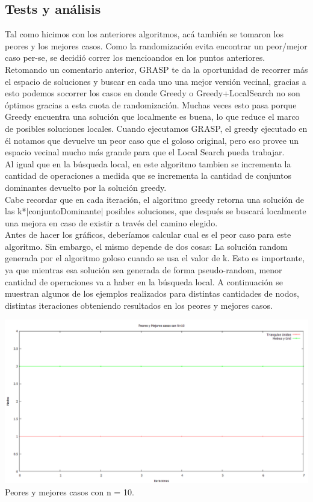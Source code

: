 \subsection{Tests y análisis}
Tal como hicimos con los anteriores algoritmos, acá también se tomaron los peores y los mejores casos. Como la randomización evita encontrar un peor/mejor caso per-se, se 
decidió correr los mencioandos
en los puntos anteriores. Retomando un comentario anterior, GRASP te da la oportunidad de recorrer más el espacio de soluciones y buscar en cada uno una mejor versión vecinal, 
gracias a esto podemos socorrer los 
casos en donde Greedy o Greedy+LocalSearch no son óptimos gracias a esta cuota de randomización. Muchas veces esto pasa porque Greedy encuentra una solución que localmente es 
buena, lo que reduce el marco 
de posibles soluciones locales. Cuando ejecutamos GRASP, el greedy ejecutado en él notamos que devuelve un peor caso que el goloso original, pero eso provee un espacio vecinal 
mucho más grande para que el Local
Search pueda trabajar. \\
Al igual que en la búsqueda local, en este algoritmo tambien se incrementa la cantidad de operaciones a medida
que se incrementa la cantidad de conjuntos dominantes devuelto por la solución greedy.\\
Cabe recordar que en cada iteración, el algoritmo greedy retorna una solución de las k*$|$conjuntoDominante$|$ posibles soluciones, que después se buscará localmente una mejora 
en caso de existir a través del camino elegido.\\
Antes de hacer los gráficos, deberíamos calcular cual es el peor caso para este algoritmo. Sin embargo, el mismo depende de dos cosas:
La solución random generada por el algoritmo goloso cuando se usa el valor de k. Esto es importante, ya que mientras esa solución sea generada de forma pseudo-random, menor cantidad
de operaciones va a haber en la búsqueda local.
A continuación se muestran algunos de los ejemplos realizados para distintas cantidades de nodos, distintas iteraciones obteniendo resultados en los peores y mejores casos.


\begin{center}
\includegraphics[width=17cm]{./graficos/grasp/peoresymejoresn10.png}\\
Peores y mejores casos con n = 10.
\end{center}

